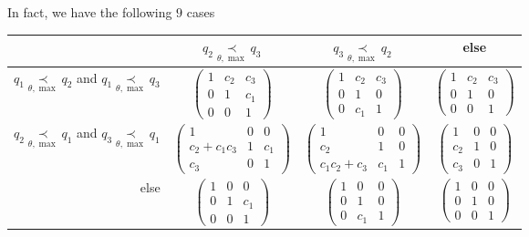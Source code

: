 In fact, we have the following $9$ cases 
\begin{center}
  \def\arraystretch{1.3}
  \setlength\tabcolsep{4mm}
  \begin{tabular}{r|c|c|c}
    & $q_2 \underset{\theta,\max}{\prec} q_3$
    & $q_3 \underset{\theta,\max}{\prec} q_2$
    & else
    \tabularnewline
    \hline
    $q_1 \underset{\theta,\max}{\prec} q_2$ and
    $q_1 \underset{\theta,\max}{\prec} q_3$
    & $\begin{pmatrix} 1 & c_2 & c_3 \\0 & 1 & c_1 \\0 & 0 & 1 \end{pmatrix}$
   \cellcolor{blue!15}
    & $\begin{pmatrix} 1 & c_2 & c_3 \\0 & 1 & 0 \\0 & c_1 & 1 \end{pmatrix}$
   \cellcolor{blue!15}
    & $\begin{pmatrix} 1 & c_2 & c_3 \\0 & 1 & 0 \\0 & 0 & 1 \end{pmatrix}$
   \cellcolor{green!15}
    \tabularnewline
    \hline
    $q_2 \underset{\theta,\max}{\prec} q_1$ and
    $q_3 \underset{\theta,\max}{\prec} q_1$
    & $\begin{pmatrix} 1 & 0 & 0 \\c_2+c_1c_3 & 1 & c_1 \\c_3 & 0 & 1 \end{pmatrix}$
   \cellcolor{blue!15}
    & $\begin{pmatrix} 1 & 0 & 0 \\c_2 & 1 & 0 \\c_1c_2+c_3 & c_1 & 1 \end{pmatrix}$
   \cellcolor{blue!15}
    & $\begin{pmatrix} 1 & 0 & 0 \\c_2 & 1 & 0 \\c_3 & 0 & 1 \end{pmatrix}$
   \cellcolor{green!15}
    \tabularnewline
    \hline
    else
    & $\begin{pmatrix} 1 & 0 & 0 \\0 & 1 & c_1 \\0 & 0 & 1 \end{pmatrix}$
   \cellcolor{purple!15}
    & $\begin{pmatrix} 1 & 0 & 0 \\0 & 1 & 0 \\0 & c_1 & 1 \end{pmatrix}$
   \cellcolor{purple!15}
    & $\begin{pmatrix} 1 & 0 & 0 \\0 & 1 & 0 \\0 & 0 & 1 \end{pmatrix}$
  \end{tabular}
\end{center}
